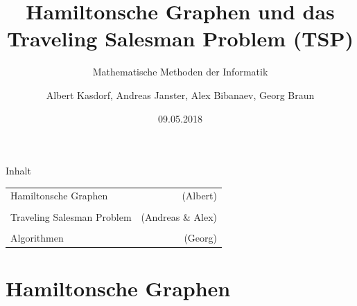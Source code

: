 \documentclass{beamer}
\title[Hamiltonsche Grafen und das TSP]{Hamiltonsche Graphen und das\\ Traveling Salesman Problem (TSP)}
\subtitle{Mathematische Methoden der Informatik}
\author[]
{
	Albert Kasdorf, Andreas Janster, Alex Bibanaev, Georg Braun
}
\institute[FH Aachen]
{
	FH Aachen\\
	Fachbereich Elektrotechnik und Informationstechnik\\
	Ingenieur-Informatik
}
\date{09.05.2018}
\begin{document}
%
%
\frame{\titlepage}


%
%
\begin{frame}{Inhalt}


	\begin{tabular}{ l r }
		Hamiltonsche Graphen & (Albert) \\
		\\
		Traveling Salesman Problem & (Andreas \& Alex) \\
		\\
		Algorithmen & (Georg)
	\end{tabular}

\end{frame}


%
%
%
\part{Hamiltonsche Graphen}
\end{document}
